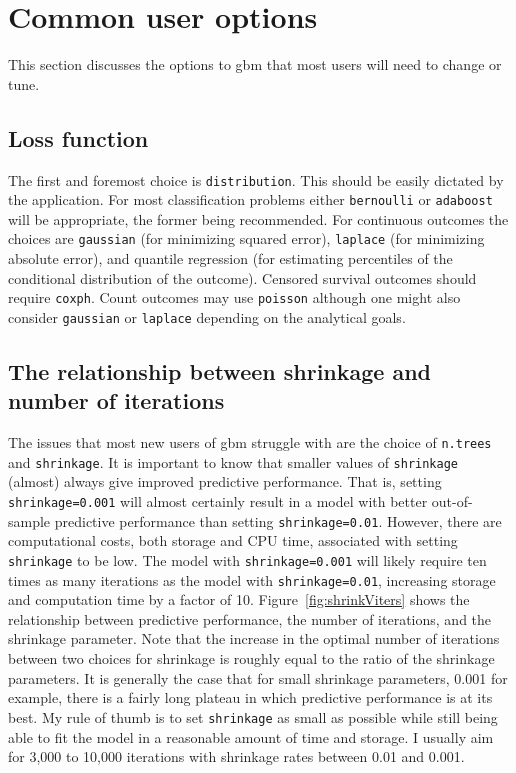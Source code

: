 \documentclass{article}
\begin{document}
\section{Common user options}

This section discusses the options to gbm that most users will need to change or tune.

\subsection{Loss function}

The first and foremost choice is \texttt{distribution}. This should
be easily dictated by the application. For most classification
problems either \texttt{bernoulli} or \texttt{adaboost} will be
appropriate, the former being recommended. For continuous outcomes
the choices are \texttt{gaussian} (for minimizing squared error),
\texttt{laplace} (for minimizing absolute error), and quantile
regression (for estimating percentiles of the conditional
distribution of the outcome). Censored survival outcomes should
require \texttt{coxph}. Count outcomes may use \texttt{poisson}
although one might also consider \texttt{gaussian} or
\texttt{laplace} depending on the analytical goals.

\subsection{The relationship between shrinkage and number of iterations}
The issues that most new users of gbm struggle with are the choice of \texttt{n.trees} and \texttt{shrinkage}. It is important to know that smaller values of \texttt{shrinkage} (almost) always give improved predictive performance. That is, setting \texttt{shrinkage=0.001} will almost certainly result in a model with better out-of-sample predictive performance than setting \texttt{shrinkage=0.01}. However, there are computational costs, both storage and CPU time, associated with setting \texttt{shrinkage} to be low. The model with \texttt{shrinkage=0.001} will likely require ten times as many iterations as the model with \texttt{shrinkage=0.01}, increasing storage and computation time by a factor of 10. Figure~\ref{fig:shrinkViters} shows the relationship between predictive performance, the number of iterations, and the shrinkage parameter. Note that the increase in the optimal number of iterations between two choices for shrinkage is roughly equal to the ratio of the shrinkage parameters. It is generally the case that for small shrinkage parameters, 0.001 for example, there is a fairly long plateau in which predictive performance is at its best. My rule of thumb is to set \texttt{shrinkage} as small as possible while still being able to fit the model in a reasonable amount of time and storage. I usually aim for 3,000 to 10,000 iterations with shrinkage rates between 0.01 and 0.001.
\end{document}
